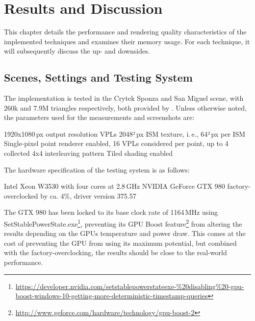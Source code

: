 

\chapter{Results and Discussion}
\label{chap:results}

This chapter details the performance and rendering quality characteristics of the implemented techniques and examines their memory usage. For each technique, it will subsequently discuss the up- and downsides.

\section{Scenes, Settings and Testing System}
\label{sec:results:settings}

The implementation is tested in the Crytek Sponza and San Miguel scene, with 260k and 7.9M triangles respectively, both provided by \citet{McGuire2011Data}. Unless otherwise noted, the parameters used for the measurements and screenshots are:

\begin{outline}
    \1 1920x1080\,px output resolution
     VPLs
    \1 2048²\,px ISM texture, i.\,e., 64²\,px per ISM
    \1 Single-pixel point renderer enabled, 16 VPLs considered per point, up to 4 collected
    \1 4x4 interleaving pattern
    \1 Tiled shading enabled
\end{outline}

\noindent
The hardware specification of the testing system is as follows:

\begin{outline}
    \1 Intel Xeon W3530 with four cores at 2.8\,GHz
    \1 NVIDIA GeForce GTX 980 factory-overclocked by ca. 4\%, driver version 375.57
\end{outline}

\noindent
The GTX 980 has been locked to its base clock rate of 1164\,MHz using SetStablePowerState.exe\footnote{\url{https://developer.nvidia.com/setstablepowerstateexe-\%20disabling\%20-gpu-boost-windows-10-getting-more-deterministic-timestamp-queries}}, preventing its GPU Boost feature\footnote{\url{http://www.geforce.com/hardware/technology/gpu-boost-2}} from altering the results depending on the GPUs temperature and power draw. This comes at the cost of preventing the GPU from using its maximum potential, but combined with the factory-overclocking, the results should be close to the real-world performance.

